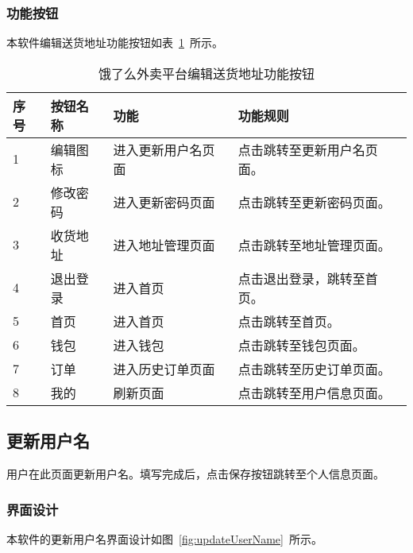 \subsubsection{功能按钮}
本软件编辑送货地址功能按钮如表~\ref{tab:table16}~所示。
\begin{table}[htbp]
    \caption{饿了么外卖平台编辑送货地址功能按钮}\label{tab:table16}
    \vspace{0.5em}\wuhao
    \begin{tabularx}{\textwidth}{lllX}
    \toprule[1.5pt]
    序号 & 按钮名称 & 功能 & 功能规则 \\ 
    \midrule[1pt]
    1 & 编辑图标 & 进入更新用户名页面 & 点击跳转至更新用户名页面。 \\
    2 & 修改密码 & 进入更新密码页面 & 点击跳转至更新密码页面。 \\
    3 & 收货地址 & 进入地址管理页面 & 点击跳转至地址管理页面。 \\
    4 & 退出登录 & 进入首页 & 点击退出登录，跳转至首页。 \\
    5 & 首页 & 进入首页 & 点击跳转至首页。 \\
    6 & 钱包 & 进入钱包 & 点击跳转至钱包页面。 \\
    7 & 订单 & 进入历史订单页面 & 点击跳转至历史订单页面。 \\
    8 & 我的 & 刷新页面 & 点击跳转至用户信息页面。 \\
\bottomrule[1.5pt]
\end{tabularx}
\vspace{\baselineskip}
\end{table}

\subsection{更新用户名}
用户在此页面更新用户名。填写完成后，点击保存按钮跳转至个人信息页面。
\subsubsection{界面设计}
本软件的更新用户名界面设计如图~\ref{fig:updateUserName}~所示。
